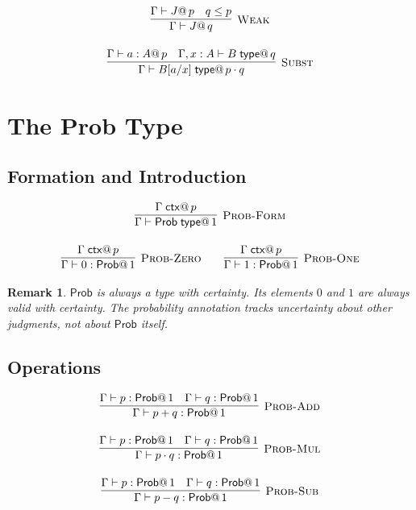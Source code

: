 \documentclass[11pt,a4paper]{article}
\makeatletter
\newtheorem{remark}{Remark}[section]
\newcommand{\ctx}{\;\mathsf{ctx}}
\newcommand{\type}{\;\mathsf{type}}
\newcommand{\Prob}{\mathsf{Prob}}
\newcommand{\pmark}[1]{@\, #1}  %
\makeatother
\begin{document}
\begin{gather}
\infer[\textsc{Weak}]
  {\Gamma \vdash J \pmark{q}}
  {\Gamma \vdash J \pmark{p} & q \leq p}
\\[1em]
\infer[\textsc{Subst}]
  {\Gamma \vdash B[a/x] \type \pmark{p \cdot q}}
  {\Gamma \vdash a : A \pmark{p} & \Gamma, x : A \vdash B \type \pmark{q}}
\end{gather}

\section{The Prob Type}

\subsection{Formation and Introduction}

\begin{gather}
\infer[\textsc{Prob-Form}]
  {\Gamma \vdash \Prob \type \pmark{1}}
  {\Gamma \ctx \pmark{p}}
\\[1em]
\infer[\textsc{Prob-Zero}]
  {\Gamma \vdash 0 : \Prob \pmark{1}}
  {\Gamma \ctx \pmark{p}}
\qquad
\infer[\textsc{Prob-One}]
  {\Gamma \vdash 1 : \Prob \pmark{1}}
  {\Gamma \ctx \pmark{p}}
\end{gather}

\begin{remark}
$\Prob$ is always a type with certainty. Its elements $0$ and $1$ are always valid with certainty. The probability annotation tracks uncertainty about \emph{other} judgments, not about $\Prob$ itself.
\end{remark}

\subsection{Operations}

\begin{gather}
\infer[\textsc{Prob-Add}]
  {\Gamma \vdash p + q : \Prob \pmark{1}}
  {\Gamma \vdash p : \Prob \pmark{1} & \Gamma \vdash q : \Prob \pmark{1}}
\\[1em]
\infer[\textsc{Prob-Mul}]
  {\Gamma \vdash p \cdot q : \Prob \pmark{1}}
  {\Gamma \vdash p : \Prob \pmark{1} & \Gamma \vdash q : \Prob \pmark{1}}
\\[1em]
\infer[\textsc{Prob-Sub}]
  {\Gamma \vdash p - q : \Prob \pmark{1}}
  {\Gamma \vdash p : \Prob \pmark{1} & \Gamma \vdash q : \Prob \pmark{1}}
\end{gather}
\end{document}
